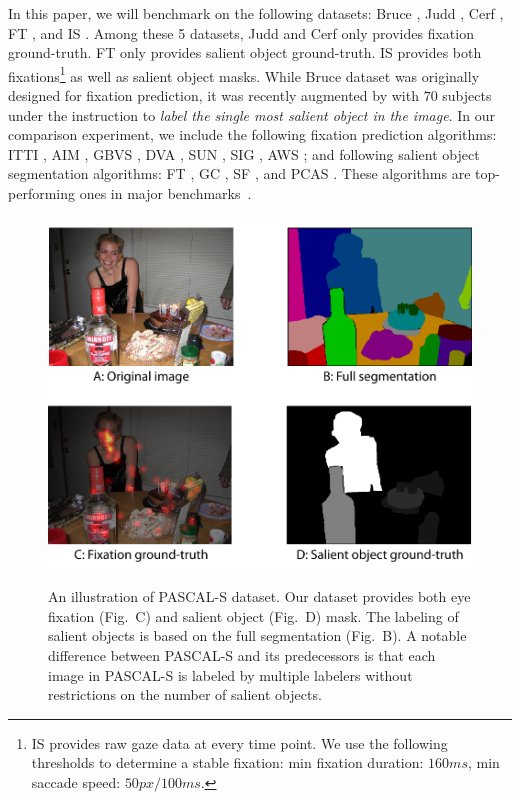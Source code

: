 In this paper, we will benchmark on the following datasets: Bruce \cite{bruce2005saliency}, Judd \cite{judd2009learning}, Cerf \cite{cerf2008predicting}, FT \cite{achanta2009frequency}, and IS \cite{li2013visual}.  Among these 5 datasets, Judd and Cerf only provides fixation ground-truth.  FT only provides salient object ground-truth.  IS provides both fixations\footnote{IS provides raw gaze data at every time point.  We use the following thresholds to determine a stable fixation: min fixation duration: $160 ms$, min saccade speed: $50px/100ms$.} as well as salient object masks.  While Bruce dataset was originally designed for fixation prediction, it was recently augmented by \cite{borji2013stands} with $70$ subjects under the instruction to \emph{label the single most salient object in the image}.
In our comparison experiment, we include the following fixation prediction algorithms: ITTI \cite{itti1998model}, AIM \cite{bruce2005saliency}, GBVS \cite{achanta2009frequency}, DVA \cite{hou2008dynamic}, SUN \cite{zhang2008sun}, SIG \cite{hou2012image}, AWS \cite{garcia2012relationship}; and following salient object segmentation algorithms: FT \cite{achanta2009frequency}, GC \cite{cheng2011global}, SF \cite{perazzi2012saliency}, and PCAS \cite{margolin2013makes}. These algorithms are top-performing ones in major benchmarks~\cite{borji2012salient}.

\begin{figure}[t]
\centering
\includegraphics[width=0.7\linewidth]{objLabelGT.pdf}\\
\caption{An illustration of PASCAL-S dataset.  Our dataset provides both eye fixation (Fig.~C) and salient object (Fig.~D) mask.  The labeling of salient objects is based on the full segmentation (Fig.~B).  A notable difference between PASCAL-S and its predecessors is that each image in PASCAL-S is labeled by multiple labelers without restrictions on the number of salient objects.}\label{fig:objLabelGT}
\end{figure}

